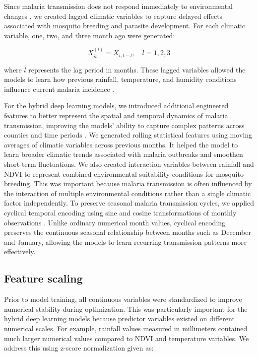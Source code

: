 Since malaria transmission does not respond immediately to environmental changes \cite{Bhatt2015}, we created lagged climatic variables to capture delayed effects associated with mosquito breeding and parasite development. For each climatic variable, one, two, and three month ago were generated:

\[
X_{it}^{(l)} = X_{i,t-l}, \quad l = 1,2,3
\]

where \(l\) represents the lag period in months. These lagged variables allowed the models to learn how previous rainfall, temperature, and humidity conditions influence current malaria incidence \cite{Okundalaye2025Climate-based}.

For the hybrid deep learning models, we introduced additional engineered features to better represent the spatial and temporal dynamics of malaria transmission, improving the models’ ability to capture complex patterns across counties and time periods \cite{Srivastava2025}. We generated rolling statistical features  using moving averages of climatic variables across previous months. It helped the model to learn broader climatic trends associated with malaria outbreaks and smoothen short-term fluctuations. We also created interaction variables  between rainfall and NDVI to represent combined environmental suitability conditions for mosquito breeding. This was important because malaria transmission is often influenced by the interaction of multiple environmental conditions rather than a single climatic factor independently. To preserve seasonal malaria transmission cycles, we applied cyclical temporal encoding  using sine and cosine transformations of monthly observations \cite{Goodfellow-et-al-2016}. Unlike ordinary numerical month values, cyclical encoding preserves the continuous seasonal relationship between months such as December and January, allowing the models to learn recurring transmission patterns more effectively.

\subsection{Feature scaling}
\label{sec:feature_scaling}
Prior to model training, all continuous variables were standardized to improve numerical stability during optimization. This was particularly important for the hybrid deep learning models because predictor variables existed on different numerical scales. For example, rainfall values measured in millimeters contained much larger numerical values compared to NDVI and temperature variables. We address this using  z-score normalization \cite{Srivastava2025} given as:

